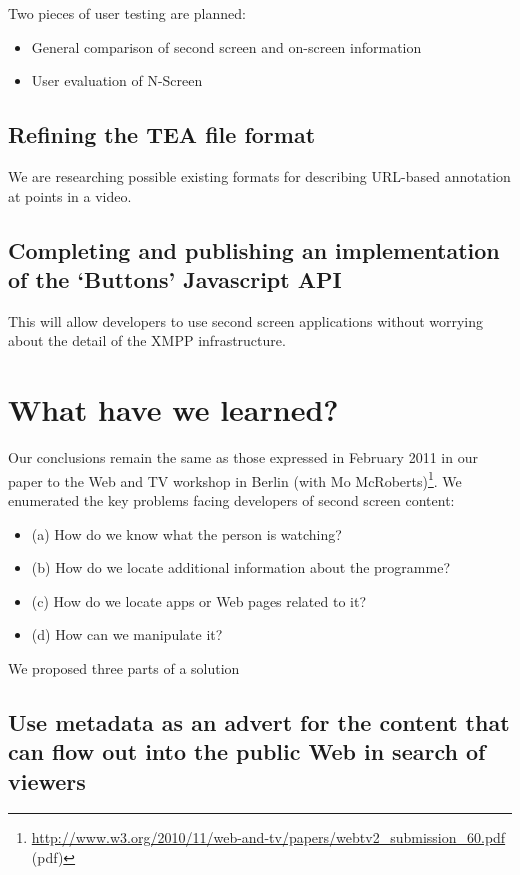 \documentclass{notube}
\begin{document}
Two pieces of user testing are planned:

\begin{itemize}
\item{General comparison of second screen and on-screen information}
\item{User evaluation of N-Screen}
\end{itemize}

\section{Refining the TEA file format}

We are researching possible existing formats for describing URL-based annotation at points in a video.

\section{Completing and publishing an implementation of the `Buttons' Javascript API}

This will allow developers to use second screen applications without worrying about the detail of the XMPP infrastructure.


\chapter{What have we learned?}

Our conclusions remain the same as those expressed in February 2011 in our paper to the Web and TV workshop in Berlin (with Mo McRoberts)\footnote{\url{http://www.w3.org/2010/11/web-and-tv/papers/webtv2_submission_60.pdf} (pdf)}. We enumerated the key problems facing developers of second screen content:

\begin{itemize}
\item{(a) How do we know what the person is watching?}
\item{(b) How do we locate additional information about the programme?}
\item{(c) How do we locate apps or Web pages related to it?}
\item{(d) How can we manipulate it?}
\end{itemize}

We proposed three parts of a solution


\section{Use metadata as an advert for the content that can flow out into the public Web in search of viewers}
\end{document}
